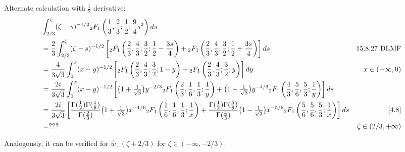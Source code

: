 \documentclass[11pt,a4paper,twoside,leqno,noamsfonts]{amsart}
\numberwithin{equation}{section}
\begin{document}
\begin{example}[Airy]
\color{violet}
Alternate calculation with $\tfrac{1}{2}$ derivative:
\begin{align*}
&\int_{2/3}^{\zeta}(\zeta-s)^{-1/2} {}_2F_1\left(\frac{1}{3},\frac{2}{3};\frac{1}{2};\frac{9}{4}s^2\right) ds \\
&= \frac{2}{3} \int_{2/3}^{\zeta}(\zeta-s)^{-1/2} \left[ {}_2F_1\left(\frac{2}{3},\frac{4}{3};\frac{3}{2};\frac{1}{2}-\frac{3s}{4}\right) + {}_2F_1\left(\frac{2}{3},\frac{4}{3};\frac{3}{2};\frac{1}{2}+\frac{3s}{4}\right) \right] ds & 15.8.27 \text{ DLMF} \\
&=\frac{4}{3\sqrt{3}}\int_0^x(x-y)^{-1/2}\left[ {}_2F_1\left(\frac{2}{3},\frac{4}{3};\frac{3}{2};1-y\right) + {}_2F_1\left(\frac{2}{3},\frac{4}{3};\frac{3}{2};y\right)\right]dy & x\in (-\infty,0) \\
&=\frac{2i}{3\sqrt{3}}\int_0^x(x-y)^{-1/2}\left[ \big(1+\tfrac{1}{\sqrt{3}}\big) y^{-2/3} {}_2F_1\left(\frac{2}{3}, \frac{1}{6}, \frac{1}{3};\frac{1}{y}\right) + \big(1-\tfrac{1}{\sqrt{3}}\big) y^{-4/3} {}_2F_1\left(\frac{4}{3}, \frac{5}{6}, \frac{5}{3};\frac{1}{y}\right) \right] ds \\
&=\frac{2i}{3\sqrt{3}} \left[ \frac{\Gamma(\tfrac{1}{2})\Gamma(\tfrac{1}{6})}{\Gamma(\tfrac{2}{3})} \big(1+\tfrac{1}{\sqrt{3}}\big) x^{-1/6} {}_2F_1\left(\frac{1}{6}, \frac{1}{6}, \frac{1}{3};\frac{1}{x}\right) + \frac{\Gamma(\tfrac{1}{2})\Gamma(\tfrac{5}{6})}{\Gamma(\tfrac{4}{3})}\big(1-\tfrac{1}{\sqrt{3}}\big) x^{-5/6} {}_2F_1\left(\frac{5}{6}, \frac{5}{6}, \frac{5}{3};\frac{1}{x}\right) \right] ds & \eqref{4.8} \\
&=??? & \zeta\in (2/3,+\infty)
\end{align*}
\color{black}

Analogously, it can be verified for $\hat{w}_-(\zeta+2/3)$ for $\zeta\in(-\infty,-2/3)$.  
%



\end{example}
\end{document}
